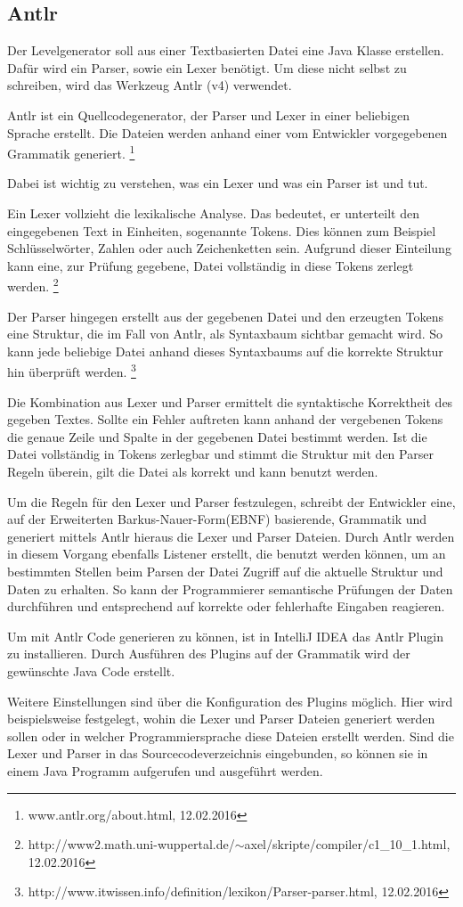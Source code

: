 \subsection{Antlr}

Der Levelgenerator soll aus einer Textbasierten Datei eine Java Klasse erstellen. Dafür wird ein Parser, sowie ein Lexer benötigt. Um diese nicht selbst zu schreiben, wird das Werkzeug Antlr (v4) verwendet.

Antlr ist ein Quellcodegenerator, der Parser und Lexer in einer beliebigen Sprache erstellt. Die Dateien werden anhand einer vom Entwickler vorgegebenen Grammatik generiert. \footnote{www.antlr.org/about.html, 12.02.2016} 

Dabei ist wichtig zu verstehen, was ein Lexer und was ein Parser ist und tut. 

Ein Lexer vollzieht die lexikalische Analyse. Das bedeutet, er unterteilt den eingegebenen Text in Einheiten, sogenannte Tokens. Dies können zum Beispiel Schlüsselwörter, Zahlen oder auch Zeichenketten sein. Aufgrund dieser Einteilung kann eine, zur Prüfung gegebene, Datei vollständig in diese Tokens zerlegt werden. 
\footnote{http://www2.math.uni-wuppertal.de/$\sim$axel/skripte/compiler/c1\_10\_1.html, 12.02.2016} 

Der Parser hingegen erstellt aus der gegebenen Datei und den erzeugten Tokens eine Struktur, die im Fall von Antlr, als Syntaxbaum sichtbar gemacht wird. So kann jede beliebige Datei anhand dieses Syntaxbaums auf die korrekte Struktur hin überprüft werden. \footnote{http://www.itwissen.info/definition/lexikon/Parser-parser.html, 12.02.2016}

Die Kombination aus Lexer und Parser ermittelt die syntaktische Korrektheit des gegeben Textes. Sollte ein Fehler auftreten kann anhand der vergebenen Tokens die genaue Zeile und Spalte in der gegebenen Datei bestimmt werden. Ist die Datei vollständig in Tokens zerlegbar und stimmt die Struktur mit den Parser Regeln überein, gilt die Datei als korrekt und kann benutzt werden.

Um die Regeln für den Lexer und Parser festzulegen, schreibt der Entwickler eine, auf der Erweiterten Barkus-Nauer-Form(EBNF) basierende, Grammatik und generiert mittels Antlr hieraus die Lexer und Parser Dateien. Durch Antlr werden in diesem Vorgang ebenfalls Listener erstellt, die benutzt werden können, um an bestimmten Stellen beim Parsen der Datei Zugriff auf die aktuelle Struktur und Daten zu erhalten. So kann der Programmierer semantische Prüfungen der Daten durchführen und entsprechend auf korrekte oder fehlerhafte Eingaben reagieren.

Um mit Antlr Code generieren zu können, ist in IntelliJ IDEA das Antlr Plugin zu installieren. Durch Ausführen des Plugins auf der Grammatik wird der gewünschte Java Code erstellt.

Weitere Einstellungen sind über die Konfiguration des Plugins möglich. Hier wird beispielsweise festgelegt, wohin die Lexer und Parser Dateien generiert werden sollen oder in welcher Programmiersprache diese Dateien erstellt werden. 
Sind die Lexer und Parser in das Sourcecodeverzeichnis eingebunden, so können sie in einem Java Programm aufgerufen und ausgeführt werden.
